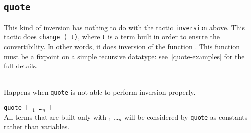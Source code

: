 


\subsection{\tt quote \ident
{}
}

This kind of inversion has nothing to do with the tactic
\texttt{inversion} above. This tactic does \texttt{change (\ident\
  t)}, where \texttt{t} is a term built in order to ensure the
convertibility. In other words, it does inversion of the function
\ident. This function must be a fixpoint on a simple recursive
datatype: see~\ref{quote-examples} for the full details.

\begin{ErrMsgs}
\item {}\\
  Happens when \texttt{quote} is not able to perform inversion properly.
\end{ErrMsgs}

\begin{Variants}
\item \texttt{quote {\ident} [ \ident$_1$ \dots \ident$_n$ ]}\\
  All terms that are built only with \ident$_1$ \dots \ident$_n$ will be
  considered by \texttt{quote} as constants rather than variables.
\end{Variants}


